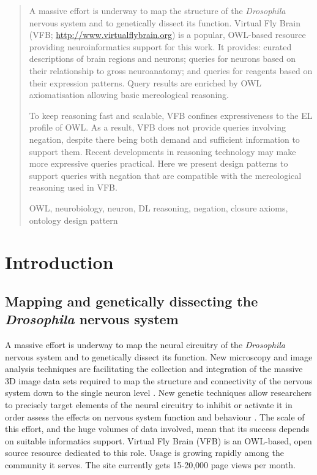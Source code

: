 \documentclass[runningheads,a4paper]{llncs}
\newcommand{\keywords}[1]{\par\addvspace\baselineskip
\noindent\keywordname\enspace\ignorespaces#1}
\begin{document}
\begin{abstract}
A massive effort is underway to map the structure of the \textit{Drosophila}
nervous system and to genetically dissect its function. Virtual Fly
Brain (VFB; \url{http://www.virtualflybrain.org}) is a popular, OWL-based resource
providing neuroinformatics support for this work.  It provides: curated
descriptions of brain regions and neurons; queries for neurons based
on their relationship to gross neuroanatomy; and queries for reagents
based on their expression patterns. Query results are enriched by OWL
axiomatisation allowing basic mereological reasoning.

To keep reasoning fast and scalable, VFB confines expressiveness to
the EL profile of OWL. As a result, VFB does not provide queries
involving negation, despite there being both demand and sufficient
information to support them. Recent developments in
reasoning technology may make more expressive queries practical.  Here
we present design patterns to support queries with negation that are
compatible with the mereological reasoning used in VFB.

\keywords{OWL, neurobiology, neuron, DL reasoning, negation, closure
  axioms, ontology design pattern}
\end{abstract}

\section{Introduction}


\subsection{Mapping and genetically dissecting the \textit{Drosophila}
  nervous system}


A massive effort is underway to map the neural circuitry of the
\textit{Drosophila} nervous system and to genetically dissect its
function. New microscopy and image analysis techniques are
facilitating the collection and integration of the massive 3D image
data sets required to map the structure and connectivity of the
nervous system down to the single neuron level
\cite{pmid21129968,Manton2014}. New genetic
techniques allow researchers to precisely target elements of the
neural circuitry to inhibit or activate it in order assess the effects
on nervous system function and behaviour \cite{pmid22205518}. The scale of this 
effort, and the huge volumes of data involved, mean that its success
depends on suitable informatics support. Virtual Fly Brain (VFB)
\cite{pmid22180411,pmid22402613} is an OWL-based, open source
resource dedicated to this role. Usage is growing rapidly among the community
it serves.  The site currently gets 15-20,000 page views per month.
\end{document}
